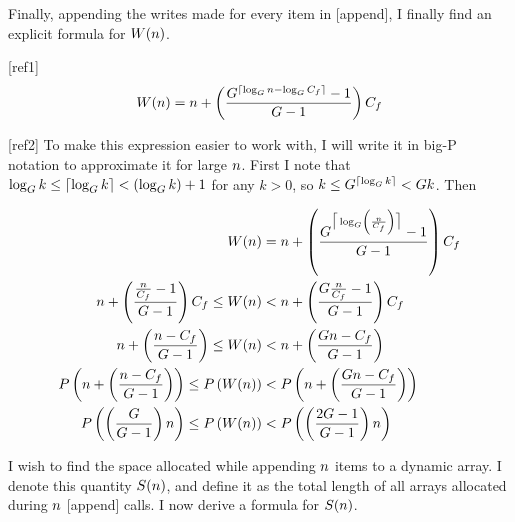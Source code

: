 Finally, appending the writes made for every item in [append], I finally find an explicit formula for $W(n)$.

[ref1]
$$
W(n) = n + \left( \frac{G^{\lceil \log_{G} n - \log_{G} C_f \rceil} - 1}{G - 1} \right) C_f
$$

[ref2]
To make this expression easier to work with, I will write it in big-P notation to approximate it for large $n$. First I note that $\log_{G} k \leq \lceil \log_{G} k \rceil < \left( \log_{G} k \right) + 1$ for any $k > 0$, so $k \leq G^{\lceil \log_{G} k \rceil} < G{k}$. Then

\begin{align*}
W(n) &= n + \left( \frac{G^{\big\lceil \log_{G} \left( \frac {n} {C_f} \right) \big\rceil} - 1}{G - 1} \right) C_f\\
n + \left( \frac{\frac{n}{C_f} - 1}{G - 1} \right) C_f \leq W(n) &< n + \left( \frac{G\frac{n}{C_f} - 1}{G - 1} \right) C_f\\
n + \left( \frac{n - C_f}{G - 1} \right) \leq W(n) &< n + \left( \frac{Gn - C_f}{G - 1} \right)\\
P\left( n + \left( \frac{n - C_f}{G - 1} \right) \right) \leq P\left( W(n) \right) &< P\left( n + \left( \frac{Gn - C_f}{G - 1} \right) \right)\\
P\left( \left( \frac{G}{G - 1} \right) n \right) \leq P\left( W(n) \right) &< P\left( \left( \frac{2G - 1}{G - 1} \right) n \right)
\end{align*}

\scomplex

I wish to find the space allocated while appending $n$ items to a dynamic array. I denote this quantity $S(n)$, and define it as the total length of all arrays allocated during $n$ [append] calls. I now derive a formula for $S(n)$.

